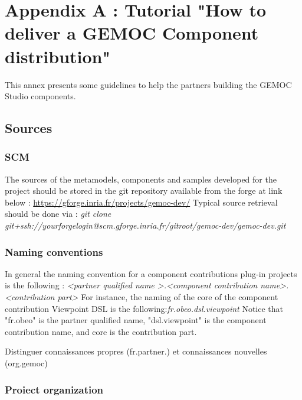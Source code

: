 \documentclass{gemoc} %
\begin{document}

\newpage
\chapter{Appendix A : Tutorial "How to deliver a GEMOC Component distribution"}
This annex presents some guidelines to help the partners building the GEMOC Studio components.
\section{Sources}
\subsection{SCM}
The sources of the metamodels, components and samples developed for the project should be stored in the git repository available from the forge at link below :\newline
\url{https://gforge.inria.fr/projects/gemoc-dev/}
\newline\newline
Typical source retrieval should be done via :\newline
\textit{git clone git+ssh://yourforgelogin@scm.gforge.inria.fr/gitroot/gemoc-dev/gemoc-dev.git}
\subsection{Naming conventions}
In general the naming convention for a component contributions plug-in projects is the following :
\newline
\textit{\textless partner qualified name \textgreater.\textless component contribution name\textgreater .\textless contribution part\textgreater }
\newline\newline
For instance, the naming of the core of the component contribution Viewpoint DSL is the following:\textit{fr.obeo.dsl.viewpoint}
\newline
Notice that "fr.obeo" is the partner qualified name, "dsl.viewpoint" is the component contribution name, and core is the contribution part.
\newline

Distinguer connaissances propres (fr.partner.) et connaissances nouvelles (org.gemoc)
\subsection{Proiect organization}
\end{document}
